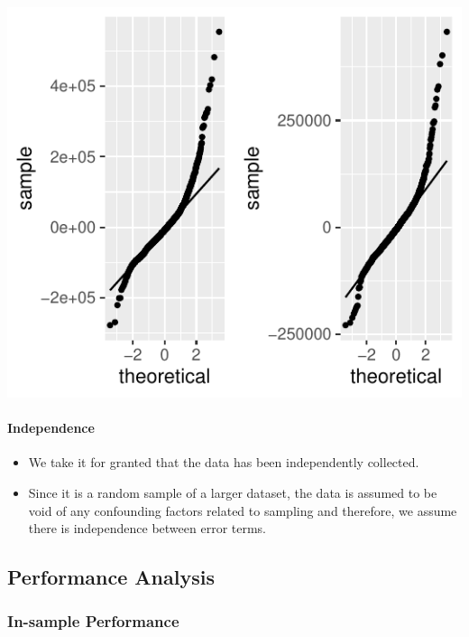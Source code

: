 \documentclass[letterpaper,9pt,twocolumn,twoside,]{pinp}
\providecommand{\tightlist}{%
  \setlength{\itemsep}{0pt}\setlength{\parskip}{0pt}}
\begin{document}
\begin{center}\includegraphics{Final-Report_files/figure-latex/unnamed-chunk-11-1} \end{center}

\hypertarget{independence}{%
\paragraph{Independence}\label{independence}}

\begin{itemize}
\tightlist
\item
  We take it for granted that the data has been independently
  collected.\\
\item
  Since it is a random sample of a larger dataset, the data is assumed
  to be void of any confounding factors related to sampling and
  therefore, we assume there is independence between error terms.
\end{itemize}

\hypertarget{performance-analysis}{%
\subsection{Performance Analysis}\label{performance-analysis}}

\hypertarget{in-sample-performance}{%
\subsubsection{In-sample Performance}\label{in-sample-performance}}
\end{document}
